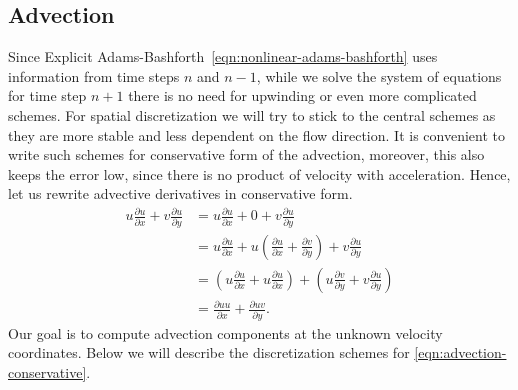 \documentclass{article}
\numberwithin{equation}{section}
\begin{document}
\subsection{Advection}\label{subsec:advection}

Since Explicit Adams-Bashforth~\cref{eqn:nonlinear-adams-bashforth} uses information from time steps $n$ and $n-1$, while we solve the system of equations for time step $n+1$ there is no need for upwinding or even more complicated schemes. For spatial discretization we will try to stick to the central schemes as they are more stable and less dependent on the flow direction. It is convenient to write such schemes for conservative form of the advection, moreover, this also keeps the error low, since there is no product of velocity with acceleration. Hence, let us rewrite advective derivatives in conservative form. 
\begin{align}\label{eqn:advection-conservative}
	u\frac{\partial u}{\partial x}+v \frac{\partial u}{\partial y}
	&=u\frac{\partial u}{\partial x}+0+v \frac{\partial u}{\partial y}\nonumber\\
	&= u\frac{\partial u}{\partial x}+ u\left(\frac{\partial u}{\partial x} +\frac{\partial v}{\partial y}\right ) +v \frac{\partial u}{\partial y}\nonumber\\
	&=\left(u\frac{\partial u}{\partial x}+ u\frac{\partial u}{\partial x}\right ) +\left(u\frac{\partial v}{\partial y} +v \frac{\partial u}{\partial y}\right )\nonumber\\
	&=\frac{\partial uu}{\partial x}+ \frac{\partial uv}{\partial y}.
\end{align}
Our goal is to compute advection components at the unknown velocity coordinates. Below we will describe the discretization schemes for \cref{eqn:advection-conservative}. 
\end{document}
